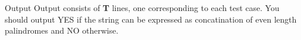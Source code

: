 Output  
Output consists of   \textbf{    T   }   lines, one corresponding to each test case. You should output   YES   if the string can be expressed as concatination of even length palindromes and   NO   otherwise.